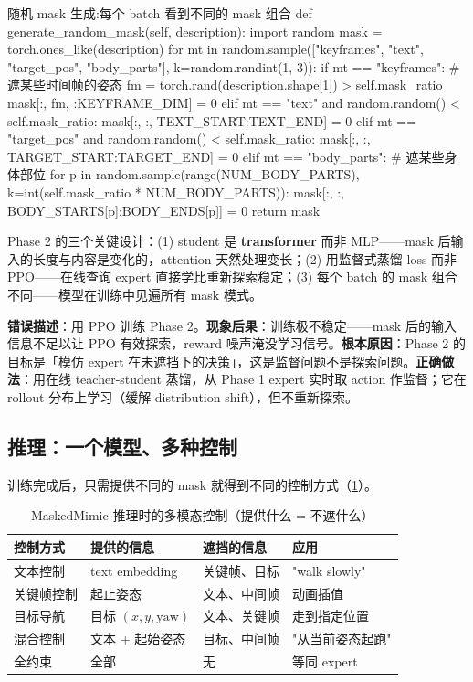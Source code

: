 \begin{codebox}[Python]{随机 mask 生成:每个 batch 看到不同的 mask 组合}
def generate_random_mask(self, description):
    import random
    mask = torch.ones_like(description)
    for mt in random.sample(["keyframes", "text", "target_pos", "body_parts"],
                            k=random.randint(1, 3)):
        if mt == "keyframes":              # 遮某些时间帧的姿态
            fm = torch.rand(description.shape[1]) > self.mask_ratio
            mask[:, fm, :KEYFRAME_DIM] = 0
        elif mt == "text" and random.random() < self.mask_ratio:
            mask[:, :, TEXT_START:TEXT_END] = 0
        elif mt == "target_pos" and random.random() < self.mask_ratio:
            mask[:, :, TARGET_START:TARGET_END] = 0
        elif mt == "body_parts":           # 遮某些身体部位
            for p in random.sample(range(NUM_BODY_PARTS),
                                   k=int(self.mask_ratio * NUM_BODY_PARTS)):
                mask[:, :, BODY_STARTS[p]:BODY_ENDS[p]] = 0
    return mask
\end{codebox}

Phase 2 的三个关键设计：(1) student 是 \textbf{transformer} 而非 MLP——mask 后输入的长度与内容是变化的，attention 天然处理变长；(2) 用监督式蒸馏 loss 而非 PPO——在线查询 expert 直接学比重新探索稳定；(3) 每个 batch 的 mask 组合不同——模型在训练中见遍所有 mask 模式。

\begin{pitfall}
\textbf{错误描述}：用 PPO 训练 Phase 2。\textbf{现象后果}：训练极不稳定——mask 后的输入信息不足以让 PPO 有效探索，reward 噪声淹没学习信号。\textbf{根本原因}：Phase 2 的目标是「模仿 expert 在未遮挡下的决策」，这是监督问题不是探索问题。\textbf{正确做法}：用在线 teacher-student 蒸馏，从 Phase 1 expert 实时取 action 作监督；它在 rollout 分布上学习（缓解 distribution shift），但不重新探索。
\end{pitfall}

\subsection{推理：一个模型、多种控制}
\label{sec:rlmc-mm-masked-infer}

训练完成后，只需提供不同的 mask 就得到不同的控制方式（\cref{tab:rlmc-mm-masked-modes}）。

\begin{table}[ht]
\centering
\small
\caption{MaskedMimic 推理时的多模态控制（提供什么 = 不遮什么）}
\label{tab:rlmc-mm-masked-modes}
\begin{tabular}{@{}llll@{}}
\toprule
控制方式 & 提供的信息 & 遮挡的信息 & 应用 \\
\midrule
文本控制 & text embedding & 关键帧、目标 & "walk slowly" \\
关键帧控制 & 起止姿态 & 文本、中间帧 & 动画插值 \\
目标导航 & 目标 $(x,y,\mathrm{yaw})$ & 文本、关键帧 & 走到指定位置 \\
混合控制 & 文本 + 起始姿态 & 目标、中间帧 & "从当前姿态起跑" \\
全约束 & 全部 & 无 & 等同 expert \\
\bottomrule
\end{tabular}
\end{table}

